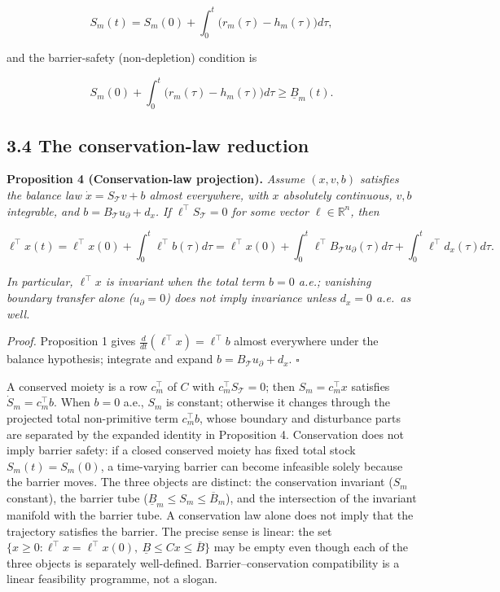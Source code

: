 \documentclass[11pt]{article}
\begin{document}
$$S_m(t) = S_m(0) + \int_0^t \bigl( r_m(\tau) - h_m(\tau) \bigr) d\tau,$$

 and the barrier-safety (non-depletion) condition is 

$$S_m(0) + \int_0^t \bigl( r_m(\tau) - h_m(\tau) \bigr) d\tau \ge \underline{B}_m(t).$$



\subsection*{3.4 The conservation-law reduction}\label{34-the-conservation-law-reduction}

\textbf{Proposition 4 (Conservation-law projection).} \emph{Assume \((x,v,b)\) satisfies the balance law \(\dot x=S_{\mathcal{T}}v+b\) almost everywhere, with \(x\) absolutely continuous, \(v,b\) integrable, and \(b=B_{\mathcal{T}}u_\partial+d_x\). If \(\ell^\top S_{\mathcal{T}} = 0\) for some vector \(\ell \in \mathbb{R}^n\), then} 

$$\ell^\top x(t) = \ell^\top x(0) + \int_0^t \ell^\top b(\tau) d\tau= \ell^\top x(0)+\int_0^t\ell^\top B_{\mathcal{T}}u_\partial(\tau)d\tau+\int_0^t\ell^\top d_x(\tau)d\tau.$$

 \emph{In particular, \(\ell^\top x\) is invariant when the total term \(b=0\) a.e.; vanishing boundary transfer alone (\(u_\partial=0\)) does not imply invariance unless \(d_x=0\) a.e.\ as well.}

\emph{Proof.} Proposition 1 gives \(\frac{d}{dt}(\ell^\top x) = \ell^\top b\) almost everywhere under the balance hypothesis; integrate and expand \(b=B_{\mathcal{T}}u_\partial+d_x\). \(\square\)

A conserved moiety is a row \(c_m^\top\) of \(C\) with \(c_m^\top S_{\mathcal{T}} = 0\); then \(S_m = c_m^\top x\) satisfies \(\dot S_m = c_m^\top b\). When \(b=0\) a.e., \(S_m\) is constant; otherwise it changes through the projected total non-primitive term \(c_m^\top b\), whose boundary and disturbance parts are separated by the expanded identity in Proposition 4. Conservation does not imply barrier safety: if a closed conserved moiety has fixed total stock \(S_m(t) = S_m(0)\), a time-varying barrier can become infeasible solely because the barrier moves. The three objects are distinct: the conservation invariant (\(S_m\) constant), the barrier tube (\(\underline{B}_m \le S_m \le \overline{B}_m\)), and the intersection of the invariant manifold with the barrier tube. A conservation law alone does not imply that the trajectory satisfies the barrier. The precise sense is linear: the set \(\{x \ge 0 : \ell^\top x =\allowbreak{} \ell^\top x(0),\allowbreak{}\ \underline{B} \le Cx \le \overline{B}\}\) may be empty even though each of the three objects is separately well-defined. Barrier--conservation compatibility is a linear feasibility programme, not a slogan.
\end{document}
